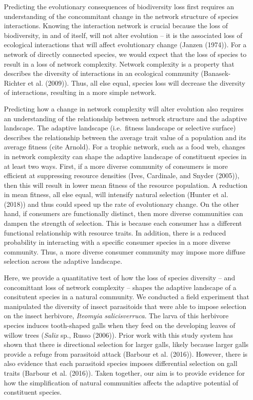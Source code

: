 \documentclass[]{elsarticle} %
\begin{document}
Predicting the evolutionary consequences of biodiversity loss first
requires an understanding of the concommitant change in the network
structure of species interactions. Knowing the interaction network is
crucial because the loss of biodiversity, in and of itself, will not
alter evolution -- it is the associated loss of ecological interactions
that will affect evolutionary change (Janzen (1974)). For a network of
directly connected species, we would expect that the loss of species to
result in a loss of network complexity. Network complexity is a property
that describes the diversity of interactions in an ecological community
(Banasek-Richter et al. (2009)). Thus, all else equal, species loss will
decrease the diversity of interactions, resulting in a more simple
network.

Predicting how a change in network complexity will alter evolution also
requires an understanding of the relationship between network structure
and the adaptive landscape. The adaptive landscape (i.e.~fitness
landscape or selective surface) describes the relationship between the
average trait value of a population and its average fitness (cite
Arnold). For a trophic network, such as a food web, changes in network
complexity can shape the adaptive landscape of constituent species in at
least two ways. First, if a more diverse community of consumers is more
efficient at suppressing resource densities (Ives, Cardinale, and Snyder
(2005)), then this will result in lower mean fitness of the resource
population. A reduction in mean fitness, all else equal, will intensify
natural selection (Hunter et al. (2018)) and thus could speed up the
rate of evolutionary change. On the other hand, if consumers are
functionally distinct, then more diverse communities can dampen the
strength of selection. This is because each consumer has a different
functional relationship with resource traits. In addition, there is a
reduced probability in interacting with a specific consumer species in a
more diverse community. Thus, a more diverse consumer community may
impose more diffuse selection across the adaptive landscape.

Here, we provide a quantitative test of how the loss of species
diversity -- and concomittant loss of network complexity -- shapes the
adaptive landscape of a consitutent species in a natural community. We
conducted a field experiment that manipulated the diversity of insect
parasitoids that were able to impose selection on the insect herbivore,
\emph{Iteomyia salicisverruca}. The larva of this herbivore species
induces tooth-shaped galls when they feed on the developing leaves of
willow trees (\emph{Salix} sp., Russo (2006)). Prior work with this
study system has shown that there is directional selection for larger
galls, likely because larger galls provide a refuge from parasitoid
attack (Barbour et al. (2016)). However, there is also evidence that
each parasitoid species imposes differential selection on gall traits
(Barbour et al. (2016)). Taken together, our aim is to provide evidence
for how the simplification of natural communities affects the adaptive
potential of constituent species.
\end{document}
